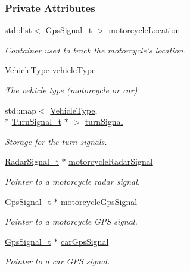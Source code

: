 \subsubsection*{Private Attributes}
\begin{DoxyCompactItemize}
\item 
std\-::list$<$ \hyperlink{structGpsSignal__t}{Gps\-Signal\-\_\-t} $>$ \hyperlink{classMotorcycleAwarenessSystem_af6becfeb1d11b467cb80a94a8e6940ac}{motorcycle\-Location}
\begin{DoxyCompactList}\small\item\em Container used to track the motorcycle's location. \end{DoxyCompactList}\item 
\hyperlink{MotorcycleAwarenessSystemTypes_8hpp_a0c05c42b98a847f971385c81c2a81afa}{Vehicle\-Type} \hyperlink{classMotorcycleAwarenessSystem_a977b2085bfbf6a62902bf2d80160e6d2}{vehicle\-Type}
\begin{DoxyCompactList}\small\item\em The vehicle type (motorcycle or car) \end{DoxyCompactList}\item 
std\-::map$<$ \hyperlink{MotorcycleAwarenessSystemTypes_8hpp_a0c05c42b98a847f971385c81c2a81afa}{Vehicle\-Type}, \\*
\hyperlink{structTurnSignal__t}{Turn\-Signal\-\_\-t} $\ast$ $>$ \hyperlink{classMotorcycleAwarenessSystem_a43fde090639a3a58fc5bbf8bafc966f7}{turn\-Signal}
\begin{DoxyCompactList}\small\item\em Storage for the turn signals. \end{DoxyCompactList}\item 
\hyperlink{structRadarSignal__t}{Radar\-Signal\-\_\-t} $\ast$ \hyperlink{classMotorcycleAwarenessSystem_a0744e71b9f440a86f5078c876ba7629b}{motorcycle\-Radar\-Signal}
\begin{DoxyCompactList}\small\item\em Pointer to a motorcycle radar signal. \end{DoxyCompactList}\item 
\hyperlink{structGpsSignal__t}{Gps\-Signal\-\_\-t} $\ast$ \hyperlink{classMotorcycleAwarenessSystem_ab281a3993b574923b2f379ed0477b2d4}{motorcycle\-Gps\-Signal}
\begin{DoxyCompactList}\small\item\em Pointer to a motorcycle G\-P\-S signal. \end{DoxyCompactList}\item 
\hyperlink{structGpsSignal__t}{Gps\-Signal\-\_\-t} $\ast$ \hyperlink{classMotorcycleAwarenessSystem_a9a8185e00b60d0be58bfa76166063128}{car\-Gps\-Signal}
\begin{DoxyCompactList}\small\item\em Pointer to a car G\-P\-S signal. \end{DoxyCompactList}\end{DoxyCompactItemize}
